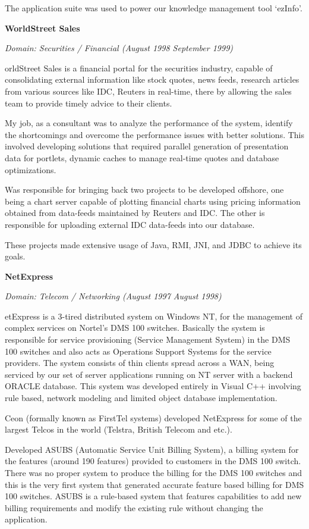 \documentclass[a4paper,12pt]{article}
\newcommand\cvprojectentry[5]{
  \textbf{#1}
  
  \it{Domain: #2}\normalfont{} \quad (#3 \textendash #4)
  
}
\begin{document}
The application suite was used to power our knowledge management tool
`ezInfo'.
 
\cvprojectentry{WorldStreet Sales}{Securities / Financial}{August 1998}{September 1999}

 
WorldStreet Sales is a financial portal for the securities industry,
capable of consolidating external information like stock quotes, news
feeds, research articles from various sources like IDC, Reuters in
real-time, there by allowing the sales team to provide timely advice to
their clients.
 
My job, as a consultant was to analyze the performance of the system,
identify the shortcomings and overcome the performance issues with
better solutions. This involved developing solutions that required
parallel generation of presentation data for portlets, dynamic caches
to manage real-time quotes and database optimizations.
 
Was responsible for bringing back two projects to be developed
offshore, one being a chart server capable of plotting financial
charts using pricing information obtained from data-feeds maintained
by Reuters and IDC. The other is responsible for uploading external
IDC data-feeds into our database.
 
These projects made extensive usage of Java, RMI, JNI, and JDBC to
achieve its goals.
 
\cvprojectentry{NetExpress}{Telecom / Networking}{August 1997}{August 1998}

NetExpress is a 3-tired distributed system on Windows NT, for the
management of complex services on Nortel’s DMS 100 switches. Basically
the system is responsible for service provisioning (Service Management
System) in the DMS 100 switches and also acts as Operations Support
Systems for the service providers. The system consists of thin clients
spread across a WAN, being serviced by our set of server applications
running on NT server with a backend ORACLE database. This system was
developed entirely in Visual C++ involving rule based, network
modeling and limited object database implementation.
 
Ceon (formally known as FirstTel systems) developed NetExpress for
some of the largest Telcos in the world (Telstra, British Telecom and
etc.).
 
Developed ASUBS (Automatic Service Unit Billing System), a billing
system for the features (around 190 features) provided to customers in
the DMS 100 switch. There was no proper system to produce the billing
for the DMS 100 switches and this is the very first system that
generated accurate feature based billing for DMS 100 switches. ASUBS
is a rule-based system that features capabilities to add new billing
requirements and modify the existing rule without changing the
application.
 
\end{document}
